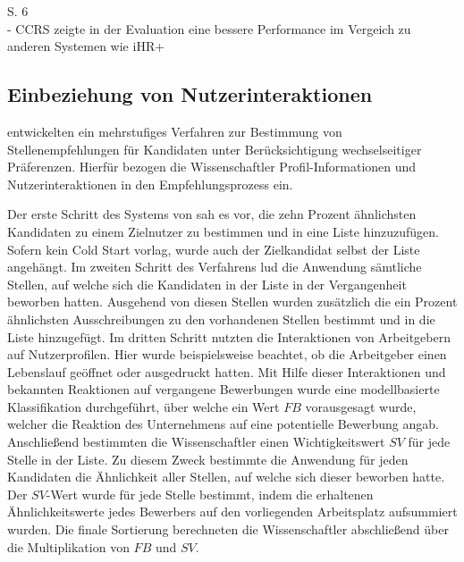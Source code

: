 S. 6\\
- CCRS zeigte in der Evaluation eine bessere Performance im Vergeich zu anderen Systemen wie iHR+

\subsection{Einbeziehung von Nutzerinteraktionen}
\label{ch:verwandteArbeiten:nichtAufDemPEFitBasierendeBilateraleSysteme:oezcan}
\textcite[S. 1ff.]{oezcan:2016} entwickelten ein mehrstufiges Verfahren zur Bestimmung von Stellenempfehlungen für Kandidaten unter Berücksichtigung wechselseitiger Präferenzen. Hierfür bezogen die Wissenschaftler Profil-Informationen und Nutzerinteraktionen in den Empfehlungsprozess ein.

Der erste Schritt des Systems von \textcite[S. 1ff.]{oezcan:2016} sah es vor, die zehn Prozent ähnlichsten Kandidaten zu einem Zielnutzer zu bestimmen und in eine Liste hinzuzufügen. Sofern kein Cold Start vorlag, wurde auch der Zielkandidat selbst der Liste angehängt. Im zweiten Schritt des Verfahrens lud die Anwendung sämtliche Stellen, auf welche sich die Kandidaten in der Liste in der Vergangenheit beworben hatten. Ausgehend von diesen Stellen wurden zusätzlich die ein Prozent ähnlichsten Ausschreibungen zu den vorhandenen Stellen bestimmt und in die Liste hinzugefügt. Im dritten Schritt nutzten \textcite[S. 1ff.]{oezcan:2016} die Interaktionen von Arbeitgebern auf Nutzerprofilen. Hier wurde beispielsweise beachtet, ob die Arbeitgeber einen Lebenslauf geöffnet oder ausgedruckt hatten. Mit Hilfe dieser Interaktionen und bekannten Reaktionen auf vergangene Bewerbungen wurde eine modellbasierte Klassifikation durchgeführt, über welche ein Wert $FB$ vorausgesagt wurde, welcher die Reaktion des Unternehmens auf eine potentielle Bewerbung angab. Anschließend bestimmten die Wissenschaftler einen Wichtigkeitswert $SV$ für jede Stelle in der Liste. Zu diesem Zweck bestimmte die Anwendung für jeden Kandidaten die Ähnlichkeit aller Stellen, auf welche sich dieser beworben hatte. Der $SV$-Wert wurde für jede Stelle bestimmt, indem die erhaltenen Ähnlichkeitswerte jedes Bewerbers auf den vorliegenden Arbeitsplatz aufsummiert wurden. Die finale Sortierung berechneten die Wissenschaftler abschließend über die Multiplikation von $FB$ und $SV$.

